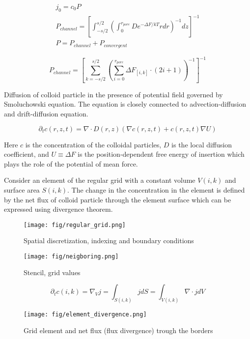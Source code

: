 \documentclass[12pt, a4paper]{article}
\begin{document}
\begin{eqnarray}
    j_0 = c_0 P
    \\
    P_{channel} = \left[\int_{-s/2}^{s/2} \left( \int_{0}^{r_{pore}} D e^{-\Delta F / kT} r dr \right)^{-1} dz \right]^{-1}
    \\
    P = P_{channel}  + P_{convergent}
\end{eqnarray}


\begin{equation}
    P_{channel} = \left[\sum_{k=-s/2}^{s/2} \left( \sum_{i=0}^{r_{pore}} \Delta F_{[i,k]} \cdot (2i+1) \right)^{-1} \right]^{-1}
\end{equation}


Diffusion of colloid particle in the presence of potential field governed by Smoluchowski equation. The equation is closely connected to advection-diffusion and drift-diffusion equation.

\begin{equation}
    \partial_{t} c(r,z,t) = \nabla \cdot D(r,z)(\nabla c(r, z, t) +  c(r, z, t) \nabla U)
\end{equation}

Here $c$ is the concentration of the colloidal particles, $D$ is the local diffusion coefficient, and $U \equiv \Delta F$ is the position-dependent free energy of insertion which plays the role of the potential of mean force.


Consider an element of the regular grid with a constant volume $V(i,k)$ and surface area $S(i,k)$.
The change in the concentration in the element is defined by the net flux of colloid particle through the element surface which can be expressed using divergence theorem.

\begin{figure}
    \centering
    \texttt{[image: fig/regular\_grid.png]}
    \caption{Spatial discretization, indexing and boundary conditions}
\end{figure}

\begin{figure}
    \centering
    \texttt{[image: fig/neigboring.png]}
    \caption{Stencil, grid values}
\end{figure}

\begin{equation}
    \partial_{t}c(i,k) = \nabla_{V} j = \int_{S(i,k)} j dS = \int_{V(i,k)} \nabla \cdot j dV
\end{equation}


\begin{figure}
    \centering
    \texttt{[image: fig/element\_divergence.png]}
    \caption{Grid element and net flux (flux divergence) trough the borders}
\end{figure}
\end{document}
